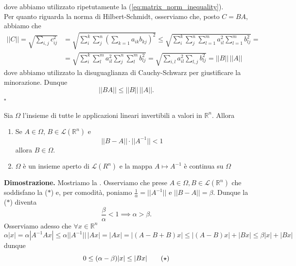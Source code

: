     dove abbiamo utilizzato ripetutamente la (\ref{eq:matrix_norm_inequality}). \\
    Per quanto riguarda la norma di Hilbert-Schmidt, osserviamo che, posto $C = BA$, abbiamo che
    \begin{align*}
    || C || = \sqrt{\sum_{i, j} c_{ij}^2} &= \sqrt{\sum_{i}^k \sum_j^n \left( \sum_{k=1} a_{ik} b_{kj} \right)^2} \leq \sqrt{\sum_{i}^k \sum_j^n \sum_{l=1}^m a_{il}^2 \sum_{l=1}^m b_{lj}^2} = \\
    &= \sqrt{\sum_i^k \sum_{l}^m a_{il}^2 \sum_{j}^n \sum_{l}^m b_{lj}^2} = \sqrt{\sum_{i, l} a_{il}^2 \sum_{l, j} b_{lj}^2} = || B || \, || A ||
    \end{align*}
    dove abbiamo utilizzato la disuguaglianza di Cauchy-Schwarz per giustificare la minorazione. Dunque
    \[
    || BA || \leq || B || \, || A ||.
    \]
\hfill $\square$
%
\vspace{0.5cm}
\begin{theorem}[\textcolor{blue}{continuità dell'operazione di inversione di una matrice}]
    Sia $\mathit{\Omega}$ l'insieme di tutte le applicazioni lineari invertibili a valori in $\mathbb{R}^n$. Allora
    \begin{enumerate}[label=\protect\circled{\arabic*}]
        \item Se $A \in \mathit{\Omega}$, $B \in \mathcal{L}(\mathbb{R}^n)$ e
        \begin{equation*}
            || B - A || \cdot || A^{-1} || < 1 \tag{$\ast$}
        \end{equation*}
        allora $B \in \mathit{\Omega}$.
        \item $\mathit{\Omega}$ è un insieme aperto di $\mathcal{L}(R^n)$ e la mappa $A \mapsto A^{-1}$ è continua su $\mathit{\Omega}$ 
    \end{enumerate}
    \label{thm:continuity_of_the_inverse_matrix}
\end{theorem}
%
\noindent \textbf{Dimostrazione. }
Mostriamo la . Osserviamo che prese $A \in \mathit{\Omega}, B \in \mathcal{L}(\mathbb{R}^n)$ che soddisfano la ($\ast$) e, per comodità, poniamo $\frac{1}{\alpha} = || A^{-1} ||$ e $|| B - A || = \beta$. Dunque la ($\ast$) diventa
\[
\frac{\beta}{\alpha} < 1 \implies \alpha > \beta.
\]
Osserviamo adesso che $\forall x \in \mathbb{R}^n$
\[
\alpha |x| = \alpha | A^{-1} A x | \leq \alpha || A^{-1} || \, |Ax| = |Ax| = |(A - B + B)x| \leq |(A-B)x| + |Bx| \leq \beta |x| + |Bx|
\]
dunque
\begin{equation*}
0 \leq (\alpha - \beta) |x| \leq |Bx| \tag{\text{$\star$}}
\end{equation*}
